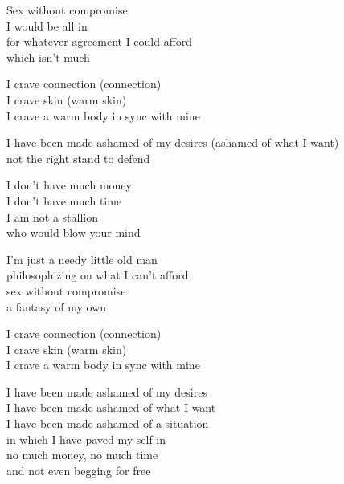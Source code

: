 \begin{lyrics}
Sex without compromise\\
I would be all in\\
for whatever agreement I could afford\\
which isn't much

I crave connection (connection)\\
I crave skin (warm skin)\\
I crave a warm body in sync with mine

I have been made ashamed of my desires
(ashamed of what I want)\\
not the right stand to defend

I don't have much money\\
I don't have much time\\
I am not a stallion\\
who would blow your mind

I'm just a needy little old man\\
philosophizing on what I can't afford\\
sex without compromise\\
a fantasy of my own

I crave connection (connection)\\
I crave skin (warm skin)\\
I crave a warm body in sync with mine

I have been made ashamed of my desires\\
I have been made ashamed of what I want\\
I have been made ashamed of a situation\\
in which I have paved my self in\\
no much money, no much time\\
and not even begging for free
\end{lyrics}

